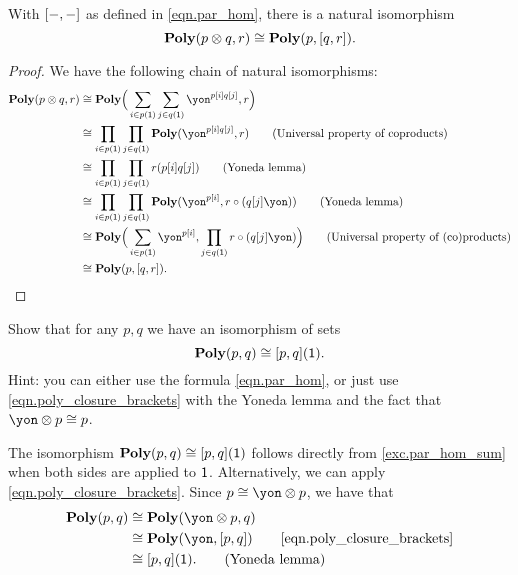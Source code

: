\documentclass[Book-Poly]{subfiles}
\begin{document}
\begin{proposition}\label{prop.parallel_closure}
With $[-,-]$ as defined in \eqref{eqn.par_hom}, there is a natural isomorphism
\begin{equation}\label{eqn.poly_closure_brackets}
	\mathbf{Poly}(p\otimes q,r)\cong\mathbf{Poly}(p,[q,r]).
\end{equation}
\end{proposition}
\begin{proof}
We have the following chain of natural isomorphisms:
\begin{align*}
	\poly(p\otimes q,r)
	&\iso
	\poly\Big(\sum_{i\in p(\1)}\sum_{j\in q(\1)}\yon^{p[i]q[j]},r\Big) \\
	&\iso
	\prod_{i\in p(\1)}\prod_{j\in q(\1)}\poly(\yon^{p[i]q[j]},r)
	\tag{Universal property of coproducts} \\
	&\iso
	\prod_{i\in p(\1)}\prod_{j\in q(\1)}r(p[i]q[j])
	\tag{Yoneda lemma} \\
	&\iso
	\prod_{i\in p(\1)}\prod_{j\in q(\1)}\poly(\yon^{p[i]},r\circ(q[j]\yon))
	\tag{Yoneda lemma} \\
	&\iso
	\poly\Big(\sum_{i\in p(\1)}\yon^{p[i]},\prod_{j\in q(\1)}r\circ(q[j]\yon)\Big)
	\tag{Universal property of (co)products} \\
	&\iso
	\poly(p,\ihom{q,r}).
\end{align*}
\end{proof}

\begin{exercise}\label{exc.poly_plug_1}
Show that for any $p,q$ we have an isomorphism of sets
\[
\mathbf{Poly}(p,q) \cong [p,q](\textsf{1}).
\]
Hint: you can either use the formula \eqref{eqn.par_hom}, or just use
\eqref{eqn.poly_closure_brackets} with the Yoneda lemma and the fact that $\yon\otimes p \iso p$.
\begin{solution}
The isomorphism $\mathbf{Poly}(p,q) \cong [p,q](\textsf{1})$ follows directly from \cref{exc.par_hom_sum} when both sides are applied to $\textsf{1}$.
Alternatively, we can apply \eqref{eqn.poly_closure_brackets}.
Since $p \iso \yon \otimes p$, we have that
\begin{align*}
    \poly(p, q) &\iso \poly(\yon \otimes p, q) \\
    &\iso \poly(\yon, \ihom{p,q}) \tag*{\eqref{eqn.poly_closure_brackets}} \\
    &\iso \ihom{p,q}(\1). \tag{Yoneda lemma}
\end{align*}
\end{solution}
\end{exercise}
\end{document}
